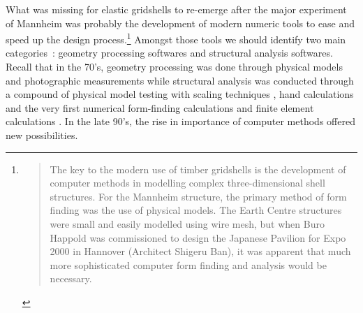 
What was missing for elastic gridshells to re-emerge after the major experiment of Mannheim was probably the development of modern numeric tools to ease and speed up the design process.\footnote{\blockcquote[]{Harris2003}{The key to the modern use of timber gridshells is the development of computer methods in modelling complex three-dimensional shell structures. For the Mannheim structure, the primary method of form finding was the use of physical models. The Earth Centre structures were small and easily modelled using wire mesh, but when Buro Happold was commissioned to design the Japanese Pavilion for Expo 2000 in Hannover (Architect Shigeru Ban), it was apparent that much more sophisticated computer form finding and analysis would be necessary.}} Amongst those tools we should identify two main categories~: geometry processing softwares and structural analysis softwares. Recall that in the 70's, geometry processing was done through physical models and photographic measurements \cite[pp.~130-135]{IL10} while structural analysis was conducted through a compound of physical model testing with scaling techniques \cite[pp.~130-135]{IL13}, hand calculations and the very first numerical form-finding calculations \cite[pp.~184-193]{IL10} and finite element calculations \cite[pp.~210-217]{IL10}. In the late 90's, the rise in importance of computer methods offered new possibilities.

